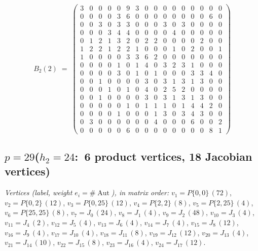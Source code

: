 \documentclass[11pt]{amsart}
\theoremstyle{plain}
\theoremstyle{definition}
\begin{document}
	\begingroup\footnotesize\setlength{\arraycolsep}{2.6pt}
	\[ B_2(2)\;=\;\left(\begin{array}{*{16}{r}}
		3 & 0 & 0 & 0 & 0 & 9 & 3 & 0 & 0 & 0 & 0 & 0 & 0 & 0 & 0 & 0 \\
		0 & 0 & 0 & 0 & 3 & 6 & 0 & 0 & 0 & 0 & 0 & 0 & 0 & 0 & 6 & 0 \\
		0 & 0 & 3 & 0 & 3 & 3 & 0 & 0 & 0 & 3 & 0 & 3 & 0 & 0 & 0 & 0 \\
		0 & 0 & 0 & 3 & 4 & 4 & 0 & 0 & 0 & 0 & 4 & 0 & 0 & 0 & 0 & 0 \\
		0 & 1 & 2 & 1 & 3 & 2 & 0 & 2 & 2 & 0 & 0 & 0 & 0 & 2 & 0 & 0 \\
		1 & 2 & 2 & 1 & 2 & 2 & 1 & 0 & 0 & 0 & 1 & 0 & 2 & 0 & 0 & 1 \\
		1 & 0 & 0 & 0 & 0 & 3 & 3 & 6 & 2 & 0 & 0 & 0 & 0 & 0 & 0 & 0 \\
		0 & 0 & 0 & 0 & 1 & 0 & 1 & 4 & 0 & 3 & 2 & 3 & 1 & 0 & 0 & 0 \\
		0 & 0 & 0 & 0 & 3 & 0 & 1 & 0 & 1 & 0 & 0 & 0 & 3 & 3 & 4 & 0 \\
		0 & 0 & 1 & 0 & 0 & 0 & 0 & 3 & 0 & 3 & 1 & 3 & 1 & 3 & 0 & 0 \\
		0 & 0 & 0 & 1 & 0 & 1 & 0 & 4 & 0 & 2 & 5 & 2 & 0 & 0 & 0 & 0 \\
		0 & 0 & 1 & 0 & 0 & 0 & 0 & 3 & 0 & 3 & 1 & 3 & 1 & 3 & 0 & 0 \\
		0 & 0 & 0 & 0 & 0 & 1 & 0 & 1 & 1 & 1 & 0 & 1 & 4 & 4 & 2 & 0 \\
		0 & 0 & 0 & 0 & 1 & 0 & 0 & 0 & 1 & 3 & 0 & 3 & 4 & 3 & 0 & 0 \\
		0 & 3 & 0 & 0 & 0 & 0 & 0 & 0 & 4 & 0 & 0 & 0 & 6 & 0 & 0 & 2 \\
		0 & 0 & 0 & 0 & 0 & 6 & 0 & 0 & 0 & 0 & 0 & 0 & 0 & 0 & 8 & 1
	\end{array}\right) \]
	\endgroup
	
	\subsection*{\texorpdfstring{$p=29$\quad ($h_2=24$:\ 6 product vertices, 18 Jacobian vertices)}{p=29 (h2=24: 6 product vertices, 18 Jacobian vertices)}}
	\begin{sloppypar}\noindent\scriptsize\textit{Vertices (label, weight $e_i=\#\operatorname{Aut}$), in matrix order:} $v_{1}{=}P\{0,0\}\,(72)$, $v_{2}{=}P\{0,2\}\,(12)$, $v_{3}{=}P\{0,25\}\,(12)$, $v_{4}{=}P\{2,2\}\,(8)$, $v_{5}{=}P\{2,25\}\,(4)$, $v_{6}{=}P\{25,25\}\,(8)$, $v_{7}{=}J_{0}\,(24)$, $v_{8}{=}J_{1}\,(4)$, $v_{9}{=}J_{2}\,(48)$, $v_{10}{=}J_{3}\,(4)$, $v_{11}{=}J_{4}\,(2)$, $v_{12}{=}J_{5}\,(4)$, $v_{13}{=}J_{6}\,(4)$, $v_{14}{=}J_{7}\,(4)$, $v_{15}{=}J_{8}\,(12)$, $v_{16}{=}J_{9}\,(4)$, $v_{17}{=}J_{10}\,(4)$, $v_{18}{=}J_{11}\,(8)$, $v_{19}{=}J_{12}\,(12)$, $v_{20}{=}J_{13}\,(4)$, $v_{21}{=}J_{14}\,(10)$, $v_{22}{=}J_{15}\,(8)$, $v_{23}{=}J_{16}\,(4)$, $v_{24}{=}J_{17}\,(12)$.\end{sloppypar}
	
\end{document}

